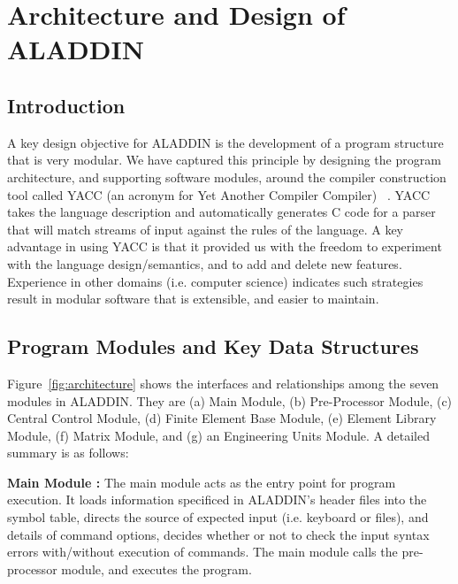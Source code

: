 \chapter{Architecture and Design of ALADDIN}

\section{Introduction}

\vspace{0.15 in}
\noindent\hspace{0.5 in}
A key design objective for ALADDIN is the
development of a program structure that is very modular.
We have captured this principle by designing
the program architecture, and supporting software modules,
around the compiler construction tool called YACC (an acronym for
Yet Another Compiler Compiler) ~\cite{johnson75}.
YACC takes the language description
and automatically generates C code for a parser that will
match streams of input against the rules of the language.
A key advantage in using YACC is that it provided us with the
freedom to experiment with the language design/semantics,
and to add and delete new features.
Experience in other domains (i.e. computer science) indicates such
strategies result in modular software that is extensible,
and easier to maintain.

\section{Program Modules and Key Data Structures}

\vspace{0.15 in}
\noindent\hspace{0.5 in}
Figure~\ref{fig:architecture} shows the interfaces and relationships
among the seven modules in ALADDIN.
They are (a) Main Module, (b) Pre-Processor Module, (c) Central Control Module,
(d) Finite Element Base Module, (e) Element Library Module,
(f) Matrix Module, and (g) an Engineering Units Module.
A detailed summary is as follows:

\vspace{0.15 in}\noindent
{\bf Main Module :}
The main module acts as the entry point for program execution.
It loads information specificed in ALADDIN's header files into the symbol table,
directs the source of expected input (i.e. keyboard or files),
and details of command options, decides whether or not to check the
input syntax errors with/without execution of commands.
The main module calls the pre-processor module,
and executes the program.

